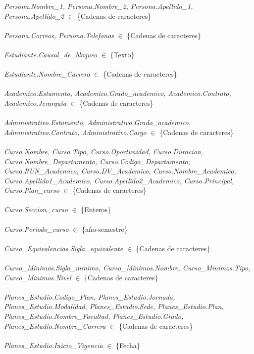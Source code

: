\documentclass[12pt]{article}
\begin{document}
\textit{Persona.Nombre\_1, Persona.Nombre\_2, Persona.Apellido\_1, Persona.Apellido\_2} $\in$ \{Cadenas de caracteres\}\\\\
\textit{Persona.Correos, Persona.Telefonos} $\in$ \{Cadenas de caracteres\}\\\\
\textit{Estudiante.Causal\_de\_bloqueo} $\in$ \{Texto\}\\\\
\textit{Estudiante.Nombre\_Carrera} $\in$ \{Cadenas de caracteres\}\\\\
\textit{Academico.Estamento, Academico.Grado\_academico, Academico.Contrato, Academico.Jerarquia} $\in$ \{Cadenas de caracteres\}\\\\
\textit{Administrativo.Estamento, Administrativo.Grado\_academico, Administrativo.Contrato, Administrativo.Cargo} $\in$ \{Cadenas de caracteres\}\\\\
\textit{Curso.Nombre, Curso.Tipo, Curso.Oportunidad, Curso.Duracion, Curso.Nombre\_Departamento, Curso.Codigo\_Departamento, Curso.RUN\_Academico, Curso.DV\_Academico, Curso.Nombre\_Academico, Curso.Apellido1\_Academico, Curso.Apellido2\_Academico, Curso.Principal, Curso.Plan\_curso} $\in$ \{Cadenas de caracteres\}\\\\
\textit{Curso.Seccion\_curso} $\in$ \{Enteros\}\\\\
\textit{Curso.Periodo\_curso} $\in$ \{año-semestre\}\\\\
\textit{Curso\_Equivalencias.Sigla\_equivalente} $\in$ \{Cadenas de caracteres\}\\\\
\textit{Curso\_Minimos.Sigla\_minimo, Curso\_Minimos.Nombre, Curso\_Minimos.Tipo, Curso\_Minimos.Nivel} $\in$ \{Cadenas de caracteres\}\\\\
\textit{Planes\_Estudio.Codigo\_Plan, Planes\_Estudio.Jornada, Planes\_Estudio.Modalidad, Planes\_Estudio.Sede, Planes\_Estudio.Plan, Planes\_Estudio.Nombre\_Facultad, Planes\_Estudio.Grado, Planes\_Estudio.Nombre\_Carrera} $\in$ \{Cadenas de caracteres\}\\\\
\textit{Planes\_Estudio.Inicio\_Vigencia} $\in$ \{Fecha\}\\\\
\end{document}
